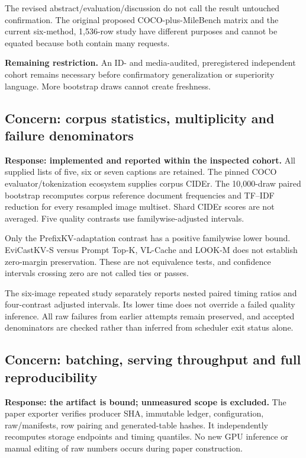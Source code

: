\documentclass[11pt]{article}
\begin{document}
The revised abstract/evaluation/discussion do not call the result untouched
confirmation. The original proposed COCO-plus-MileBench matrix and the
current six-method, 1,536-row study have different purposes and cannot be
equated because both contain many requests.

\textbf{Remaining restriction.} An ID- and media-audited, preregistered
independent cohort remains necessary before confirmatory generalization
or superiority language. More bootstrap draws cannot create freshness.

\subsection{Concern: corpus statistics, multiplicity and failure denominators}
\textbf{Response: implemented and reported within the inspected cohort.}
All supplied lists of five, six or seven captions are retained. The pinned COCO
evaluator/tokenization ecosystem supplies corpus CIDEr. The 10,000-draw
paired bootstrap recomputes corpus reference document frequencies and
TF--IDF reduction for every resampled image multiset. Shard CIDEr scores
are not averaged. Five quality contrasts use familywise-adjusted intervals.

\begin{table}[ht]
\centering\small\setlength{\tabcolsep}{3pt}

\caption{All registered quality contrasts, including negative and
inconclusive results.}
\end{table}

Only the PrefixKV-adaptation contrast has a positive familywise lower
bound. EviCastKV-S versus Prompt Top-K, VL-Cache and LOOK-M does not
establish zero-margin preservation. These are not equivalence tests, and
confidence intervals crossing zero are not called ties or passes.

The six-image repeated study separately reports nested paired timing
ratios and four-contrast adjusted intervals. Its lower time does not
override a failed quality inference. All raw failures from earlier
attempts remain preserved, and accepted denominators are checked rather
than inferred from scheduler exit status alone.

\subsection{Concern: batching, serving throughput and full reproducibility}
\textbf{Response: the artifact is bound; unmeasured scope is excluded.}
The paper exporter verifies producer SHA, immutable ledger, configuration,
raw/manifests, row pairing and generated-table hashes. It independently
recomputes storage endpoints and timing quantiles. No new GPU inference
or manual editing of raw numbers occurs during paper construction.
\end{document}
